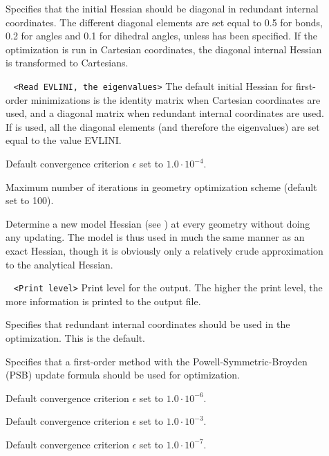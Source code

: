 \begin{description}
\item[]
Specifies that the initial Hessian should be diagonal in redundant internal 
coordinates. The different diagonal
elements are set equal to 0.5 for bonds, 0.2 for angles and 0.1 for
dihedral angles, unless  has been specified. If the
optimization is run in Cartesian coordinates, the diagonal internal
Hessian is transformed to Cartesians.

\item[]\verb| | \newline
\verb|<Read EVLINI, the eigenvalues>|\newline
The default initial Hessian for first-order
minimizations is the identity matrix when Cartesian coordinates are used, and a diagonal
matrix when redundant internal coordinates are used. If 
is used, all the diagonal elements (and therefore the eigenvalues) are
set equal to the value EVLINI. 

\item[]
Default convergence criterion $\epsilon$ set to $1.0\cdot 10^{-4}$.

\item[]
Maximum number of iterations in geometry optimization scheme
(default set to 100).

\item[]
Determine a new model Hessian (see )
at every geometry without doing any updating. The model is thus used
in much the same manner as an exact Hessian, though it is obviously
only a relatively crude approximation to the analytical Hessian.

\item[]\verb| | \newline
\verb|<Print level>|\newline
Print level for the output. The higher the print level, the more information
is printed to the output file.

\item[]
Specifies that redundant internal coordinates
should be used in the optimization. This is the default.

\item[]
Specifies that a first-order method with the
Powell-Symmetric-Broyden (PSB) 
update formula should be used for optimization.

\item[]
Default convergence criterion $\epsilon$ set to $1.0\cdot 10^{-6}$.

\item[]
Default convergence criterion $\epsilon$ set to $1.0\cdot 10^{-3}$.

\item[]
Default convergence criterion $\epsilon$ set to $1.0\cdot 10^{-7}$.

\end{description}

